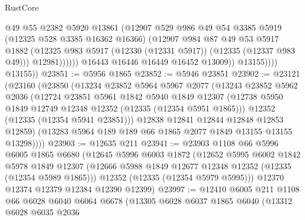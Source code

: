 \begin{lexlean}{RustCore}
\begin{coremodule}
                            @49
                            @55
                            @2382
                            @5920
                            @13861
                            (@12907
                              @529
                              @986
                              @49
                              @54
                              @3385
                              @5919
                              (@12325 @528 @3385 @16362 @16366)
                              (@12907
                                @984
                                @87
                                @49
                                @53
                                @5917
                                @1882
                                (@12325
                                  @983
                                  @5917
                                  (@12330 (@12331 @5917))
                                  (@12335 (@12337 @983 @49)))
                                @12981))))))
                    @16443
                    @16446
                    @16449
                    @16452
                    @13009))
                @13155))))
        @13155))
@23851 := @5956 @1865
@23852 := @5946 @23851
@23902 := @23121
    (@23160
      (@23850
        (@13234
          @23852
          @5964
          @5967
          @2077
          (@13243
            @23852
            @5962
            @2036
            (@12724
              @23851
              @5961
              @1842
              @5940
              @1849
              @12307
              (@12738 @5950 @1849 @12749 @12348 @12352 (@12335 (@12354 @5951 @1865)))
              @12352
              (@12335 (@12354 @5941 @23851)))
            @12838
            @12841
            @12844
            @12848
            @12853
            @12859)
          (@13283 @5964 @189 @189 @66 @1865 @2077 @1849 @13155 @13155 @13298))))
@23903 := @12635 @211
@23941 := @23903
    @1108
    @66
    @5996
    @6005
    @1865
    @6680
    (@12645
      @5996
      @6003
      @1872
      (@12652
        @5995
        @6002
        @1842
        @5978
        @1849
        @12307
        (@12666 @5988 @1849 @12677 @12348 @12352 (@12335 (@12354 @5989 @1865)))
        @12352
        (@12335 (@12354 @5979 @5995)))
      @12370
      @12374
      @12379
      @12384
      @12390
      @12399)
@23997 := @12410
    @6005
    @211
    @1108
    @66
    @6028
    @6040
    @6064
    @6678
    (@13305
      @6028
      @6037
      @1865
      @6040
      (@13312
        @6028
        @6035
        @2036

\end{coremodule}
\end{lexlean}
